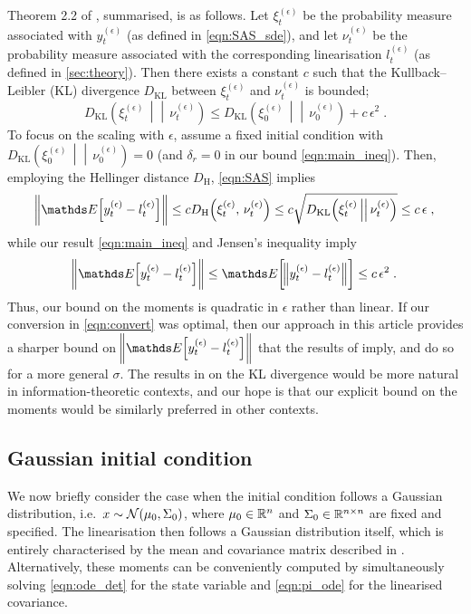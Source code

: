 Theorem 2.2 of \citet{Sanz-AlonsoStuart_2017_GaussianApproximationsSmall}, summarised, is as follows.
Let \(\xi_t^{(\epsilon)}\) be the probability measure associated with \(y_t^{(\epsilon)}\) (as defined in \cref{eqn:SAS_sde}), and let \(\nu_t^{(\epsilon)}\) be the probability measure associated with the corresponding linearisation \(l_t^{(\epsilon)}\) (as defined in \cref{sec:theory}).
Then there exists a constant \(c\) such that the Kullback--Leibler (KL) divergence \(D_{\mathrm{KL}}\) between \(\xi_t^{(\epsilon)}\) and \(\nu_t^{(\epsilon)}\) is bounded;
\begin{equation}
	\label{eqn:SAS}
	D_{\mathrm{KL}}\!\left(\xi_t^{(\epsilon)} \,\middle|\middle|\, \nu_t^{(\epsilon)}\right) \le D_{\mathrm{KL}}\!\left(\xi_0^{(\epsilon)} \,\middle|\middle|\, \nu_0^{(\epsilon)}\right) + c \, \epsilon^2\;.
\end{equation}
To focus on the scaling with \(\epsilon\), assume a fixed initial condition with \(D_{\mathrm{KL}}\!\left(\xi_0^{(\epsilon)} \,\middle|\middle|\, \nu_0^{(\epsilon)}\right) = 0\) (and \(\delta_r = 0\) in our bound \cref{eqn:main_ineq}). Then, employing the Hellinger distance \(D_{\mathrm{H}}\), \cref{eqn:SAS} implies
\begin{align}
	\label{eqn:convert}
	\norm{\avg{ y_t^{(\epsilon)} - l_t^{(\epsilon)}} } \le c D_{\mathrm{H}}\!\left(\xi_t^{(\epsilon)} ,\, \nu_t^{(\epsilon)}\right) \le c \sqrt{D_{\mathrm{KL}}\!\left(\xi_t^{(\epsilon)} \,\middle|\middle|\, \nu_t^{(\epsilon)}\right)} \le c \, \epsilon \;,
\end{align}
while our result \cref{eqn:main_ineq} and Jensen's inequality imply
\[
	\norm{\avg{ y_t^{(\epsilon)} - l_t^{(\epsilon)}} } \le \avg{\norm{y_t^{(\epsilon)} - l_t^{(\epsilon)}}} \leq c \, \epsilon^2\;.
\]
Thus, our bound on the moments is quadratic in \( \epsilon \) rather than linear.
If our conversion in \cref{eqn:convert} was optimal, then our approach in this article
provides a sharper bound on \(\norm{\avg{y_t^{(\epsilon)} - l_t^{(\epsilon)}}}\) that the
results of  \citet{Sanz-AlonsoStuart_2017_GaussianApproximationsSmall} imply, and do so for a
more general $ \sigma $.
The results in  \citet{Sanz-AlonsoStuart_2017_GaussianApproximationsSmall} on the KL divergence would be more natural in information-theoretic contexts, and our hope is that our explicit bound on the moments would be similarly preferred in other contexts.




\subsection{Gaussian initial condition}\label{sec:theory_gauss}
We now briefly consider the case when the initial condition follows a Gaussian distribution, i.e.\ \(x \sim\mathcal{N}\!\left(\mu_0, \Sigma_0\right)\), where \(\mu_0 \in \mathbb{R}^n\) and \(\Sigma_0 \in \mathbb{R}^{n \times n}\) are fixed and specified.
The linearisation then follows a Gaussian distribution itself, which is entirely characterised by the mean and covariance matrix described in .
Alternatively, these moments can be conveniently computed by simultaneously solving \cref{eqn:ode_det} for the state variable and \cref{eqn:pi_ode} for the linearised covariance.

